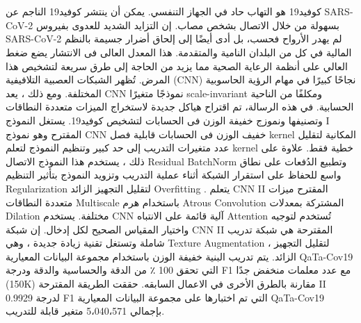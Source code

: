 
\chapter {} %
\label{araSummery} 
\begin{arab}[utf]
    كوفيد19 هو التهاب حاد في الجهاز التنفسي. يمكن أن ينتشر كوفيد19 الناجم عن SARS-CoV-2 بسهولة من خلال الاتصال بشخص مصاب. إن التزايد الشديد للعدوى بفيروس SARS-CoV-2 لم يهدر الأرواح فحسب، بل أدى أيضًا إلى إلحاق أضرار جسيمة بالنظم المالية في كل من البلدان النامية والمتقدمة. هذا  المعدل العالى فى الانتشار يضع ضغط العالي على أنظمة الرعاية الصحية مما يزيد من الحاجة إلى طرق سريعة لتشخيص هذا المرض. تُظهر الشبكات العصبية التلافيفية (CNN) نجاحًا كبيرًا في مهام الرؤية الحاسوبية المختلفة. ومع ذلك ، يعد CNN نموذجًا متغيرًا scale-invariant ومكلفًا من الناحية الحسابية. في هذه الرسالة، تم اقتراح هياكل جديدة لاستخراج الميزات متعددة النطاقات وتصنيفها ونموزج خفيفة الوزن فى الحسابات لتشخيص كوفيد19. يستغل النموذج I المقترح وهو نموذج CNN خفيف الوزن فى الحسابات قابلية فصل kernel المكانية لتقليل عدد متغيرات التدريب إلى حد كبير وتنظيم النموذج لتعلم kernel خطية فقط. علاوة على ذلك ، يستخدم هذا النموذج الاتصال Residual BatchNorm وتطبيع الدُفعات على نطاق واسع للحفاظ على استقرار الشبكة أثناء عملية التدريب وتزويد النموذج بتأثير التنظيم Regularization لتقليل التجهيز الزائد Overfitting . يتعلم CNN II المقترح ميزات متعددة النطاقات Multiscale  باستخدام هرم Atrous Convolution المشتركة بمعدلات Dilation مختلفة. يستخدم  CNN  آلية قائمة على الانتباه Attention تُستخدم لتوجيه واختيار المقياس الصحيح لكل إدخال. إن شبكة CNN II المقترحة هي شبكة تدريب شاملة وتستغل تقنية زيادة جديدة ، وهي Texture Augmentation ، لتقليل التجهيز الزائد. يتم تدريب البنية خفيفة الوزن باستخدام مجموعة البيانات المعيارية QaTa-Cov19 التي تحقق 100 ٪ من الدقة والحساسية والدقة ودرجة F1 مع عدد معلمات منخفض جدًا (150K) مقارنة بالطرق الأخرى في الاعمال السابقه. حققت الطريقة المقترحة II 0.9929 لدرجة F1 التي تم اختبارها على مجموعة البيانات المعيارية QaTa-Cov19 بإجمالي 5،040،571 متغير قابلة للتدريب.


\end{arab}

